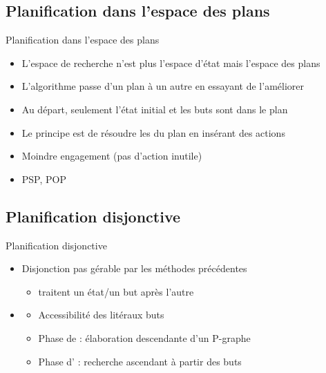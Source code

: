 \documentclass[compress]{beamer}
\begin{document}
\subsection{Planification dans l'espace des plans}
\begin{frame}{Planification dans l'espace des plans}
\begin{itemize}
\item L'espace de recherche n'est plus l'espace d'état mais l'espace des plans
\item L'algorithme passe d'un plan à un autre en essayant de l'améliorer
\item Au départ, seulement l'état initial et les buts sont dans le plan
\item Le principe est de résoudre les  du plan en insérant des actions
\item Moindre engagement (pas d'action inutile)
\item PSP, POP
\end{itemize}
\end{frame}

\subsection{Planification disjonctive}
\begin{frame}{Planification disjonctive}
\begin{itemize}
\item Disjonction pas gérable par les méthodes précédentes
	\begin{itemize}
	\item traitent un état/un but après l'autre
	\end{itemize}
\item {}
	\begin{itemize}
	\item Accessibilité des litéraux buts
	\item Phase de  : élaboration descendante d'un P-graphe
	\item Phase d' : recherche ascendant à partir des buts
	\end{itemize}
\end{itemize}
\end{frame}
\end{document}
